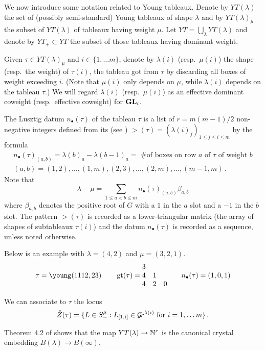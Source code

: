 \documentclass{article}
\begin{document}
We now introduce some notation related to Young tableaux. Denote by $YT(\lambda)$ the set of (possibly semi-standard) Young tableaux of shape $\lambda$ and by $YT(\lambda)_\mu$ the subset of $YT(\lambda)$ of tableaux having weight $\mu$. Let $YT = \bigcup_\lambda YT(\lambda)$ and denote by $YT_+\subset YT$ the subset of those tableaux having dominant weight. 

Given $\tau\in YT(\lambda)_\mu$ and $ i \in \{1, \dots m\} $, denote by $\lambda(i)$ (resp.\ $\mu(i)$) the shape (resp.\ the weight) of $\tau(i)$, the tableau got from $\tau$ by discarding all boxes of weight exceeding $i$. (Note that $ \mu(i)$ only depends on $ \mu$, while $ \lambda(i)$ depends on the tableau $ \tau$.)  We will regard $ \lambda(i)$ (resp.\ $\mu(i)$) as an effective dominant coweight (resp.\ effective coweight) for ${\mathbf{GL}}_i$. 
% 

The Lusztig datum $n_\bullet(\tau)$ of the tableau $\tau$ is a list of $r= m(m-1)/2$ non-negative integers defined from its  (see \cite[Sect.~4]{berenstein1988tensor}) $\gt(\tau) = (\lambda(i)_j)_{1\le j\le i\le m}$ by the formula 
$$
\begin{gathered}
    n_\bullet(\tau)_{(a,b)} = \lambda(b)_a - \lambda(b-1)_a = \text{ \# of boxes on row $a$ of $\tau $ of weight $b$}  \\
    (a,b)                   =  (1,2),\dots,(1,m),
                                (2,3),\dots,(2,m),
                                \dots,
                                (m-1,m)\,. 
\end{gathered}
$$
% 
Note that $$ \lambda - \mu = \displaystyle{\sum_{1 \le a < b \le m}n_\bullet(\tau)_{(a,b)} \beta_{a,b}} $$ where $ \beta_{a,b} $ denotes the positive root of $ G$ with a $ 1 $ in the $a $ slot and a $-1$ in the $ b $ slot. The pattern $\gt(\tau)$ is recorded as a lower-triangular matrix (the array of shapes of subtableaux $\tau(i)$) and the datum $n_\bullet(\tau)$ is recorded as a sequence, unless noted otherwise. 

Below is an example with $\lambda = (4,2)$ and $\mu = (3,2,1)$. 
\[
    \tau = \young(1112,23) \qquad \gt(\tau) = 
    \begin{matrix}
        3 \\
        4 & 1 \\ 
        4 & 2 & 0         
    \end{matrix} \qquad n_\bullet(\tau) = (1,0,1) %
\]

We can associate to $\tau$ the locus 
%  
\begin{equation*}
    \mathring Z(\tau) = 
        \{
            L\in S^\mu_- : L_{[1,i]} \in\mathcal{G}\!r^{\lambda(i)}\text{ for } i = 1, \dots m 
        \}\,. 
\end{equation*}
\begin{remark} \label{rem:claxton}
Theorem 4.2 of \cite{claxton2015young} shows that the map $ YT(\lambda) \rightarrow \mathbb N^r $ is the canonical crystal embedding $ B(\lambda) \rightarrow B(\infty)$.
\end{remark}
\end{document}
